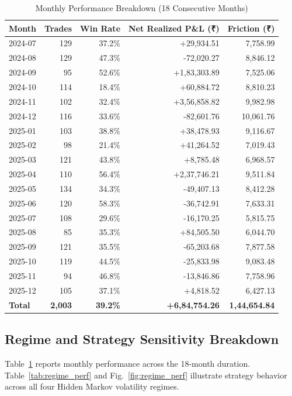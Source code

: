 \documentclass[journal]{IEEEtran}
\begin{document}
\begin{table}[!t]
\renewcommand{\arraystretch}{1.12}
\caption{Monthly Performance Breakdown (18 Consecutive Months)}
\label{tab:monthly_perf}
\centering
\scriptsize
\begin{tabular}{lrrrr}
\toprule
\textbf{Month} & \textbf{Trades} & \textbf{Win Rate} & \textbf{Net Realized P\&L (₹)} & \textbf{Friction (₹)} \\
\midrule
2024-07 & 129 & 37.2\% & +29,934.51 & 7,758.99 \\
2024-08 & 129 & 47.3\% & -72,020.27 & 8,846.12 \\
2024-09 & 95  & 52.6\% & +1,83,303.89 & 7,525.06 \\
2024-10 & 114 & 18.4\% & +60,884.72 & 8,810.23 \\
2024-11 & 102 & 32.4\% & +3,56,858.82 & 9,982.98 \\
2024-12 & 116 & 33.6\% & -82,601.76 & 10,061.76 \\
2025-01 & 103 & 38.8\% & +38,478.93 & 9,116.67 \\
2025-02 & 98  & 21.4\% & +41,264.52 & 7,019.43 \\
2025-03 & 121 & 43.8\% & +8,785.48  & 6,968.57 \\
2025-04 & 110 & 56.4\% & +2,37,746.21 & 9,511.84 \\
2025-05 & 134 & 34.3\% & -49,407.13 & 8,412.28 \\
2025-06 & 120 & 58.3\% & -36,742.91 & 7,633.31 \\
2025-07 & 108 & 29.6\% & -16,170.25 & 5,815.75 \\
2025-08 & 85  & 35.3\% & +84,505.50 & 6,044.70 \\
2025-09 & 121 & 35.5\% & -65,203.68 & 7,877.58 \\
2025-10 & 119 & 44.5\% & -25,833.98 & 9,083.48 \\
2025-11 & 94  & 46.8\% & -13,846.86 & 7,758.96 \\
2025-12 & 105 & 37.1\% & +4,818.52  & 6,427.13 \\
\midrule
\textbf{Total} & \textbf{2{,}003} & \textbf{39.2\%} & \textbf{+6,84,754.26} & \textbf{1,44,654.84} \\
\bottomrule
\end{tabular}
\end{table}

\subsection{Regime and Strategy Sensitivity Breakdown}
Table~\ref{tab:monthly_perf} reports monthly performance across the 18-month duration. Table~\ref{tab:regime_perf} and Fig.~\ref{fig:regime_perf} illustrate strategy behavior across all four Hidden Markov volatility regimes.
\end{document}
